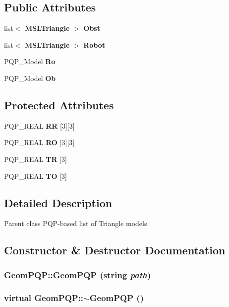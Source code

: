 \subsection*{Public Attributes}
\begin{CompactItemize}
\item 
list$<$ {\bf MSLTriangle} $>$ {\bf Obst}
\item 
list$<$ {\bf MSLTriangle} $>$ {\bf Robot}
\item 
PQP\_\-Model {\bf Ro}
\item 
PQP\_\-Model {\bf Ob}
\end{CompactItemize}
\subsection*{Protected Attributes}
\begin{CompactItemize}
\item 
PQP\_\-REAL {\bf RR} [3][3]
\item 
PQP\_\-REAL {\bf RO} [3][3]
\item 
PQP\_\-REAL {\bf TR} [3]
\item 
PQP\_\-REAL {\bf TO} [3]
\end{CompactItemize}


\subsection{Detailed Description}
Parent class PQP-based list of Triangle models.



\subsection{Constructor \& Destructor Documentation}
\subsubsection{\setlength{\rightskip}{0pt plus 5cm}Geom\-PQP::Geom\-PQP (string {\em path})}\label{classGeomPQP_a0}


\subsubsection{\setlength{\rightskip}{0pt plus 5cm}virtual Geom\-PQP::$\sim$Geom\-PQP ()\hspace{0.3cm}{\tt  [inline, virtual]}}\label{classGeomPQP_a1}




